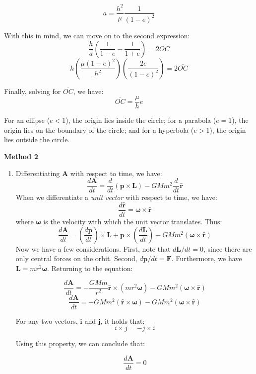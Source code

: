 \documentclass[11pt]{article}
\begin{document}
\begin{pproblem}
\begin{pssolution*}{}{}
\begin{enumerate}[label=\textbf{\Roman*.}]
            \[a = \frac{h^2}{\mu}\frac{1}{(1-e)^2}\]

            With this in mind, we can move on to the second expression:
            \[\frac{h}{a}\left(\frac{1}{1-e}-\frac{1}{1+e}\right) = 2\overline{OC}\]
            \[h\left(\frac{\mu(1-e)^2}{h^2}\right)\left(\frac{2e}{(1-e)^2}\right) = 2\overline{OC}\]
            
            Finally, solving for \(\overline{OC}\), we have:
            \[\boxed{\overline{OC} = \frac{\mu}{h}e}\]

            For an ellipse (\(e<1\)), the origin lies inside the circle; for a parabola (\(e=1\)), the origin lies on the boundary of the circle; and for a hyperbola (\(e>1\)), the origin lies outside the circle.
        \end{enumerate}

    
        \textbf{Method 2}
        \begin{enumerate}[label=\textbf{\Roman*.}]
            \item Differentiating \(\mathbf{A}\) with respect to time, we have:
            \[\frac{d\mathbf{A}}{dt} = \frac{d}{dt}(\mathbf{p}\times\mathbf{L}) - GMm^2\frac{d}{dt}\mathbf{\hat{r}}\] 
            When we differentiate a \textit{unit vector} with respect to time, we have:
            \[\frac{d\mathbf{\hat{r}}}{dt} = \mathbf{\omega}\times\mathbf{\hat{r}}\]
            where \(\mathbf{\omega}\) is the velocity with which the unit vector translates. Thus:
            \[\frac{d\mathbf{A}}{dt} = \left(\frac{d\mathbf{p}}{dt}\right)\times \mathbf{L} + \mathbf{p}\times\left(\frac{d\mathbf{L}}{dt}\right) - GMm^2(\mathbf{\omega}\times \mathbf{\hat{r}})\]
            Now we have a few considerations. First, note that \(d\mathbf{L}/dt=0\), since there are only central forces on the orbit. Second, \(d\mathbf{p}/dt = \mathbf{F}\). Furthermore, we have \(\mathbf{L} = mr^2\mathbf{\omega}\). Returning to the equation:

            \[\frac{d\mathbf{A}}{dt} = -\frac{GMm}{r^2}\mathbf{\hat{r}}\times(mr^2\mathbf{\omega}) - GMm^2(\mathbf{\omega} \times \mathbf{\hat{r}})\]
            \[\frac{d\mathbf{A}}{dt} = -GMm^2(\mathbf{\hat{r}}\times\mathbf{\omega})- GMm^2(\mathbf{\omega} \times \mathbf{\hat{r}})\]

            For any two vectors, \(\mathbf{i}\) and \(\mathbf{j}\), it holds that:
            \[i\times j = -j\times i\]

            Using this property, we can conclude that:

            \[\boxed{\frac{d\mathbf{A}}{dt} = 0}\]


\end{enumerate}
\end{pssolution*}
\end{pproblem}
\end{document}
